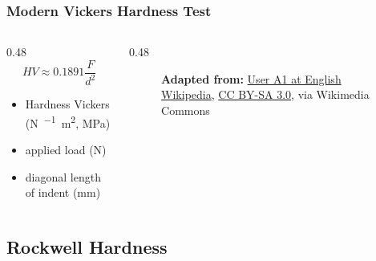 \begin{frame}
	\frametitle{Modern Vickers Hardness Test}
    \begin{columns}
        \begin{column}{0.48\linewidth}
            \[HV \approx 0.1891\dfrac{F}{d^2}\]
            \begin{itemize}[<+- | alert@+>]
                \item[$HV$] Hardness Vickers (\unit{\newton\per\milli\square\meter}, \unit{\mega\pascal})
                \item[$F$] applied load (\unit{\newton})
                \item[$d$] diagonal length of indent (\unit{\milli\meter})
            \end{itemize}
        \end{column}
        \begin{column}{0.48\linewidth}
            \begin{figure}
                \centering
                \resizebox{0.5\linewidth}{!}{
                    
                }

                \vspace{0.5em}
                {\tiny \textbf{Adapted from:}  \href{https://commons.wikimedia.org/wiki/File:Vickers-path.svg}{User A1 at English Wikipedia}, \href{https://creativecommons.org/licenses/by-sa/3.0}{CC BY-SA 3.0}, via Wikimedia Commons\par}
            \end{figure}
        \end{column}
    \end{columns}
\end{frame}

\subsection{Rockwell Hardness}


